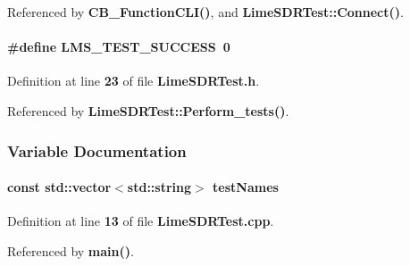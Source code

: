 Referenced by {\bf C\+B\+\_\+\+Function\+C\+L\+I()}, and {\bf Lime\+S\+D\+R\+Test\+::\+Connect()}.

\paragraph[{L\+M\+S\+\_\+\+T\+E\+S\+T\+\_\+\+S\+U\+C\+C\+E\+SS}]{\setlength{\rightskip}{0pt plus 5cm}\#define L\+M\+S\+\_\+\+T\+E\+S\+T\+\_\+\+S\+U\+C\+C\+E\+SS~0}\label{LimeSDRTest_8h_abc7b17f7151217bcd9de3912097469a1}


Definition at line {\bf 23} of file {\bf Lime\+S\+D\+R\+Test.\+h}.



Referenced by {\bf Lime\+S\+D\+R\+Test\+::\+Perform\+\_\+tests()}.



\subsubsection{Variable Documentation}
\paragraph[{test\+Names}]{\setlength{\rightskip}{0pt plus 5cm}const {\bf std\+::vector}$<${\bf std\+::string}$>$ test\+Names}\label{LimeSDRTest_8h_a0daaa6f484941a01cb381437ea12c39e}


Definition at line {\bf 13} of file {\bf Lime\+S\+D\+R\+Test.\+cpp}.



Referenced by {\bf main()}.

